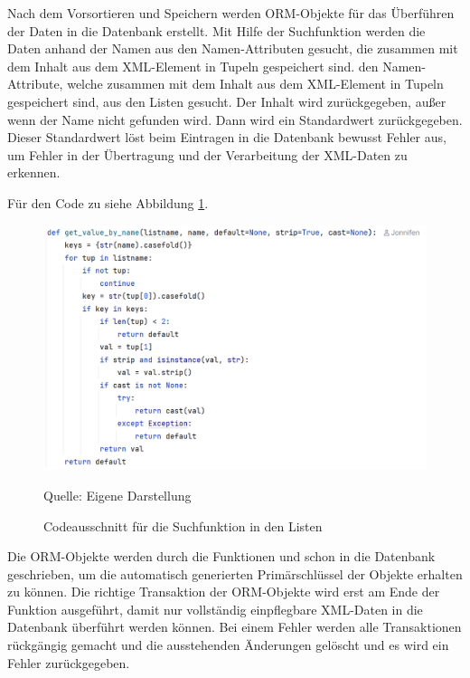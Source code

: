 Nach dem Vorsortieren und Speichern werden \ac{ORM}-Objekte für das Überführen der Daten in die Datenbank erstellt.
Mit Hilfe der Suchfunktion  werden die Daten anhand der Namen aus den Namen-Attributen gesucht,
die zusammen mit dem Inhalt aus dem XML-Element in Tupeln gespeichert sind.
den Namen-Attribute, welche zusammen mit dem Inhalt aus dem XML-Element in Tupeln gespeichert sind, aus den Listen gesucht.
Der Inhalt wird zurückgegeben, außer wenn der Name nicht gefunden wird.
Dann wird ein Standardwert zurückgegeben.
Dieser Standardwert löst beim Eintragen in die Datenbank bewusst Fehler aus, um Fehler in der Übertragung und der
Verarbeitung der XML-Daten zu erkennen.

Für den Code zu  siehe Abbildung \ref{fig: Codeausschnitt für die Suchfunktion in den Listen}.

\begin{figure}[H]
    \centering
    \includegraphics[width=1\textwidth]{Grafiken/get.png}
    \caption{Codeausschnitt für die Suchfunktion in den Listen}
    \label{fig: Codeausschnitt für die Suchfunktion in den Listen}
    {Quelle: Eigene Darstellung}
\end{figure}

Die \ac{ORM}-Objekte werden durch die Funktionen  und  schon in die Datenbank geschrieben,
um die automatisch generierten Primärschlüssel der Objekte erhalten zu können.
Die richtige Transaktion der \ac{ORM}-Objekte wird erst am Ende der Funktion  ausgeführt, damit nur
vollständig einpflegbare XML-Daten in die Datenbank überführt werden können.
Bei einem Fehler werden alle Transaktionen rückgängig gemacht und die ausstehenden Änderungen gelöscht und es wird ein Fehler zurückgegeben.

